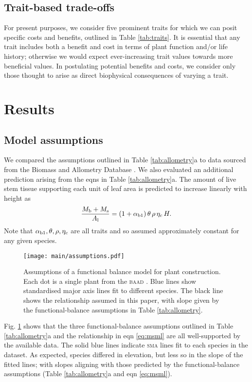\documentclass[9pt,twocolumn,twoside,lineno]{pnas-new}
\newcommand{\sma}{\textsc{sma}}
\begin{document}
\subsection{Trait-based trade-offs}

For present purposes, we consider five prominent traits for which we can posit specific costs and benefits, outlined in Table \ref{tab:traits}. It is essential that any trait includes both a benefit and cost in terms of plant function and/or life history; otherwise we would expect ever-increasing trait values towards more beneficial values. In postulating potential benefits and costs, we consider only those thought to arise as direct biophysical consequences of varying a trait.

\section*{Results}

\subsection{Model assumptions}

We compared the assumptions outlined in Table \ref{tab:allometry}a to data sourced from the Biomass and Allometry Database \citep[\textsc{baad}][]{Falster-2015b}. We also evaluated an additional prediction arising from the eqns in Table \ref{tab:allometry}a. The amount of live stem tissue supporting each unit of leaf area is predicted to increase linearly with height as
\begin{equation}\label{eq:msml}
\frac{M_{\rm b} + M_{\rm s}}{A_{\rm l}} = (1+ \alpha_{\rm b1}) \,\theta \, \rho \, \eta_c \, H.
\end{equation}
Note that $\alpha_{\rm b1}, \theta, \rho, \eta_c$ are all traits and so assumed approximately constant for any given species.


\begin{figure}[!hb]
\centering
\texttt{[image: main/assumptions.pdf]}
\caption{Assumptions of a functional balance model for plant construction.
Each dot is a single plant from the \textsc{baad} \citep{Falster-2015b}.
Blue lines show standardised major axis lines fit to different species. The black line shows the relationship assumed in this paper, with slope given by the functional-balance assumptions in Table \ref{tab:allometry}.
}
\label{fig:assumptions}
\end{figure}


Fig. \ref{fig:assumptions} shows that the three functional-balance assumptions outlined in Table \ref{tab:allometry}a and the relationship in eqn \ref{eq:msml} are all well-supported by the available data. The solid blue lines indicate {\sma} lines fit to each species in the dataset. As expected, species differed in elevation, but less so in the slope of the fitted lines; with slopes aligning with those predicted by the functional-balance assumptions (Table \ref{tab:allometry}a and eqn \ref{eq:msml}).
\end{document}
